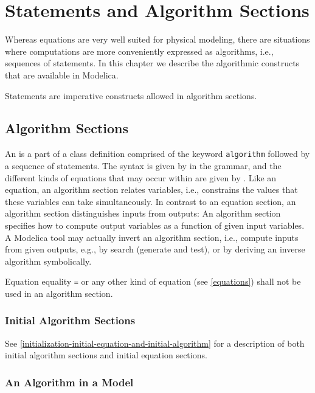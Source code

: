 \chapter{Statements and Algorithm Sections}\label{statements-and-algorithm-sections}

Whereas equations are very well suited for physical modeling, there are situations where computations are more conveniently expressed as algorithms, i.e., sequences of statements.
In this chapter we describe the algorithmic constructs that are available in Modelica.

Statements are imperative constructs allowed in algorithm sections.


\section{Algorithm Sections}\label{algorithm-sections}

An  is a part of a class definition comprised of the keyword \lstinline!algorithm! followed by a sequence of statements.
The syntax is given by  in the grammar, and the different kinds of equations that may occur within are given by .
Like an equation, an algorithm section relates variables, i.e., constrains the values that these variables can take simultaneously.
In contrast to an equation section, an algorithm section distinguishes inputs from outputs:
An algorithm section specifies how to compute output variables as a function of given input variables.
A Modelica tool may actually invert an algorithm section, i.e., compute inputs from given outputs, e.g., by search (generate and test), or by deriving an inverse algorithm symbolically.

Equation equality \lstinline!=! or any other kind of equation (see \cref{equations}) shall not be used in an algorithm section.


\subsection{Initial Algorithm Sections}\label{initial-algorithm-sections}

See \cref{initialization-initial-equation-and-initial-algorithm} for a description of both initial algorithm sections and initial equation sections.


\subsection{An Algorithm in a Model}\label{execution-of-an-algorithm-in-a-model}\label{an-algorithm-in-a-model}

